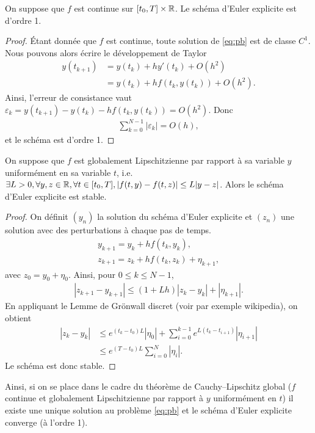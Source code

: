 \documentclass[12pt,a4paper,twoside]{article}
\begin{document}
\begin{proposition}
  On suppose que $f$ est continue sur $[t_0 , T] \times \mathbb{R}$.
  Le sch\'ema d'Euler explicite est d'ordre 1.
\end{proposition}

\begin{proof}
  \'Etant donn\'ee que $f$ est continue, toute solution de \eqref{eq:pb}
  est de classe $C^1$.
  Nous pouvons alors \'ecrire le d\'eveloppement de Taylor
  \begin{align*}
    y(t_{k+1}) 
    &= y(t_k) + h y'(t_k) + O(h^2)
    \\
    &= y(t_k) + h f(t_k , y(t_k) ) + O(h^2) .
  \end{align*}
  Ainsi, l'erreur de consistance vaut
  $\varepsilon_k = y(t_{k+1}) - y(t_k) - h f(t_k,y(t_k)) = O(h^2)$.
  Donc 
  \begin{align*}
    \sum_{k=0}^{N-1} | \varepsilon_k | = O(h) ,
  \end{align*}
  et le sch\'ema est d'ordre 1.
\end{proof}


\begin{proposition}
  On suppose que $f$ est globalement Lipschitzienne par rapport \`a sa variable
  $y$ uniform\'ement en sa variable $t$, i.e. 
  $\exists L > 0, \forall y, z \in \mathbb{R}, \forall t \in [t_0,T], 
  | f(t,y) - f(t,z) | \leq L | y - z |$.
  Alors le sch\'ema d'Euler explicite est stable.
\end{proposition}

\begin{proof}
  On d\'efinit $(y_n)$ la solution du sch\'ema d'Euler explicite
  et $(z_n)$ une solution avec des perturbations \`a chaque pas de temps.
  \begin{align*}
    y_{k+1} = y_k + h f(t_k,y_k) , 
    \\
    z_{k+1} = z_k + h f(t_k,z_k) + \eta_{k+1} ,
  \end{align*}
  avec $z_0 = y_0 + \eta_0$.
  Ainsi, pour $0 \leq k \leq N-1$,
  \begin{align*}
    | z_{k+1} - y_{k+1} | \leq (1+Lh) |z_k - y_k| + | \eta_{k+1}| .
  \end{align*}
  En appliquant le Lemme de Gr\"onwall discret (voir par exemple wikipedia),
  on obtient
  \begin{align*}
    |z_k - y_k|
    & \leq e^{(t_k - t_0) L} |\eta_0| + \sum_{i=0}^{k-1} e^{L(t_{k}-t_{i+1})} |\eta_{i+1}|
    \\
    & \leq e^{(T-t_0) L} \sum_{i=0}^{N} |\eta_i| .
  \end{align*}
  Le sch\'ema est donc stable.
\end{proof}

Ainsi, si on se place dans le cadre du th\'eor\`eme de Cauchy--Lipschitz global
($f$ continue et globalement Lipschitzienne par rapport \`a $y$ uniform\'ement en $t$)
il existe une unique solution au probl\`eme \eqref{eq:pb} et le sch\'ema
d'Euler explicite converge (\`a l'ordre 1).

\end{document}
